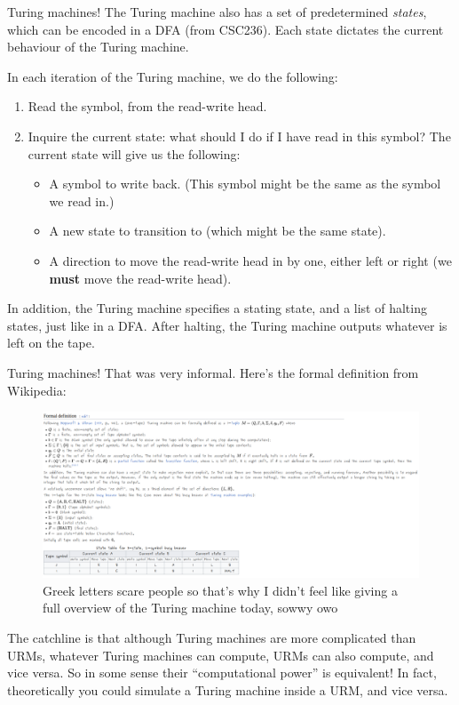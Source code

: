 \documentclass{beamer}
\begin{document}
\begin{frame}{Turing machines!}
The Turing machine also has a set of predetermined \textit{states}, which can be encoded in a DFA (from CSC236). Each state dictates the current behaviour of the Turing machine.

In each iteration of the Turing machine, we do the following:
\begin{enumerate}
\item Read the symbol, from the read-write head.
\item Inquire the current state: what should I do if I have read in this symbol? The current state will give us the following:
\begin{itemize}
\item A symbol to write back. (This symbol might be the same as the symbol we read in.)
\item A new state to transition to (which might be the same state).
\item A direction to move the read-write head in by one, either left or right (we \textbf{must} move the read-write head).
\end{itemize}
\end{enumerate}

In addition, the Turing machine specifies a stating state, and a list of halting states, just like in a DFA. After halting, the Turing machine outputs whatever is left on the tape.
\end{frame}

\begin{frame}{Turing machines!}
That was very informal. Here's the formal definition from Wikipedia:
\begin{figure}[h!]
\centering
\includegraphics[scale=0.15]{img/ss2.png}
\caption*{Greek letters scare people so that's why I didn't feel like giving a full overview of the Turing machine today, sowwy owo}
\end{figure}

The catchline is that although Turing machines are more complicated than URMs, whatever Turing machines can compute, URMs can also compute, and vice versa. So in some sense their ``computational power'' is equivalent! In fact, theoretically you could simulate a Turing machine inside a URM, and vice versa.

\end{frame}
\end{document}
